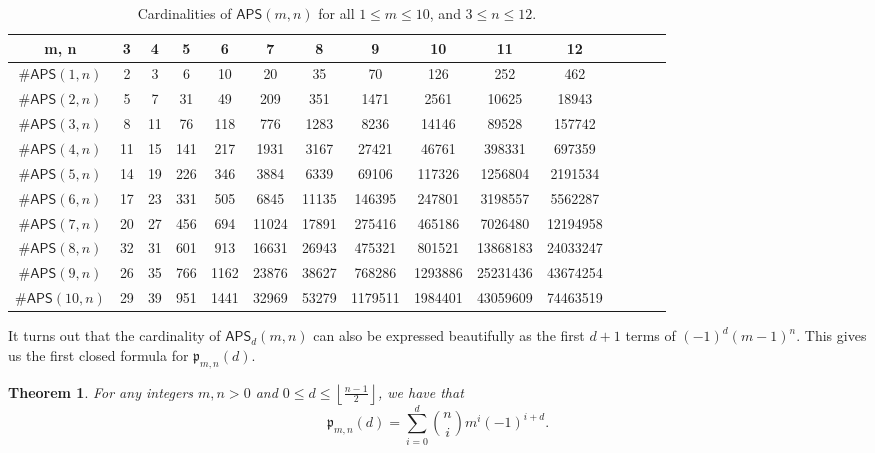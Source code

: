 \documentclass[12pt,reqno]{amsart}
\numberwithin{equation}{section}
\theoremstyle{plain}
\newtheorem{theorem}{Theorem}[section]
\theoremstyle{definition}
\theoremstyle{remark}
\newcommand{\p}{\mathfrak{p}}
\newcommand\APS{\mathsf{APS}}
\newcommand{\floor}[1]{\left\lfloor#1\right\rfloor}
\begin{document}
\begin{table}[ht]
    \centering
    \begin{tabular}{|c||*{13}{c|}c||}
        \hline
        m, n & 3 & 4 & 5 & 6 & 7 & 8 & 9 & 10 & 11 & 12\\
        \hline\hline
        $\#\APS(1, n)$ & 2 & 3 & 6 & 10 & 20 & 35 & 70 & 126 & 252 & 462\\
        \hline
        $\#\APS(2, n)$ & 5 & 7 & 31 & 49 & 209 & 351 & 1471 & 2561 & 10625 & 18943\\
        \hline 
        $\#\APS(3, n)$ & 8 & 11 & 76 & 118 & 776 & 1283 & 8236 & 14146 & 89528 & 157742\\
        \hline
        $\#\APS(4, n)$ & 11 & 15 & 141 & 217 & 1931 & 3167 & 27421 & 46761 & 398331 & 697359\\ 
        \hline 
        $\#\APS(5, n)$ & 14 & 19 & 226 & 346 & 3884 & 6339 & 69106 & 117326 & 1256804 & 2191534 \\
        \hline
        $\#\APS(6, n)$ & 17 & 23 & 331 & 505 & 6845 & 11135 & 146395 & 247801 & 3198557 & 5562287 \\ 
        \hline
        $\#\APS(7, n)$ & 20 & 27 & 456 & 694 & 11024 & 17891 & 275416 & 465186 & 7026480 & 12194958\\ 
        \hline
        $\#\APS(8, n)$ & 32 & 31 & 601 & 913 & 16631 & 26943 & 475321 & 801521 & 13868183 & 24033247 \\ 
        \hline 
        $\#\APS(9, n)$ & 26 & 35 & 766 & 1162 & 23876 & 38627 & 768286 & 1293886 & 25231436 & 43674254\\ 
        \hline  
        $\#\APS(10, n)$ & 29 & 39 & 951 & 1441 & 32969 & 53279 & 1179511 & 1984401 & 43059609 & 74463519 \\
        \hline
    \end{tabular} 
    \caption{Cardinalities of $\APS(m, n)$ for all $1 \leq m \leq 10$, and $3 \leq n \leq 12$.}
\end{table}

It turns out that the cardinality of $\APS_d(m,n)$ can also be expressed beautifully as the first $d+1$ terms of $(-1)^d(m-1)^n$. This gives us the first closed formula for $\p_{m,n}(d)$.


\begin{theorem}\label{thm:pinn-formula}
    For any integers $m,n>0$ and $0 \leq d \leq \floor{\frac{n-1}{2}}$, we have that 
\[
\p_{m,n}(d)= \sum_{i=0}^{d} \binom{n}{i}m^i(-1)^{i+d}.
\]
\end{theorem}
\end{document}
